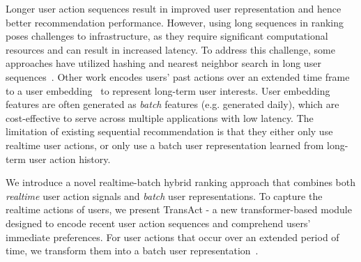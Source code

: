 Longer user action sequences result in improved user representation and hence better recommendation performance. 
However, using long sequences in ranking poses challenges to infrastructure, as they require significant computational resources and can result in increased latency.
To address this challenge, some approaches have utilized hashing and nearest neighbor search in long user sequences~\cite{pi2020search}.
Other work encodes users' past actions over an extended time frame to a user embedding~\cite{pinnerformer} to represent long-term user interests. User embedding features are often generated as \textit{batch} features (e.g. generated daily), which are cost-effective to serve across multiple applications with low latency. 
The limitation of existing sequential recommendation is that they either only use realtime user actions, or only use a batch user representation learned from long-term user action history.


We introduce a novel realtime-batch hybrid ranking approach that combines both \textit{realtime} user action signals and \textit{batch} user representations. 
To capture the realtime actions of users, we present TransAct - a new transformer-based module designed to encode recent user action sequences and comprehend users' immediate preferences.
For user actions that occur over an extended period of time, we transform them into a batch user representation~\cite{pinnerformer}.


